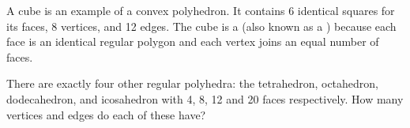 \documentclass{book}
\begin{document}
\setcounter{project}{32}
\addtocounter{project}{-1}
\begin{activity}[]\label{activity-27}
\hypertarget{p-313}{}%
A cube is an example of a convex polyhedron. It contains 6 identical squares for its faces, 8 vertices, and 12 edges. The cube is a  (also known as a ) because each face is an identical regular polygon and each vertex joins an equal number of faces.%
\par
\hypertarget{p-314}{}%
There are exactly four other regular polyhedra: the tetrahedron, octahedron, dodecahedron, and icosahedron with 4, 8, 12 and 20 faces respectively. How many vertices and edges do each of these have?%
\end{activity}

\clearpage
\end{document}
